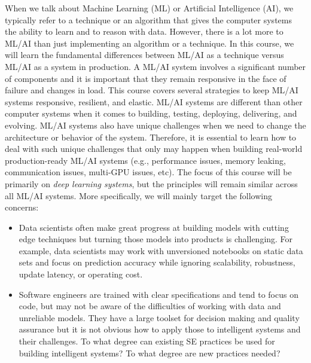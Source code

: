 \documentclass[11pt]{article}
\begin{document}
When we talk about Machine Learning (ML) or Artificial Intelligence (AI), we typically refer to a technique or an algorithm that gives the computer systems the ability to learn and to reason with data. However, there is a lot more to ML/AI than just implementing an algorithm or a technique. In this course, we will learn the fundamental differences between ML/AI as a technique versus ML/AI as a system in production. A ML/AI system involves a significant number of components and it is important that they remain responsive in the face of failure and changes in load. This course covers several strategies to keep ML/AI systems responsive, resilient, and elastic. ML/AI systems are different than other computer systems when it comes to building, testing, deploying, delivering, and evolving. ML/AI systems also have unique challenges when we need to change the architecture or behavior of the system. Therefore, it is essential to learn how to deal with such unique challenges that only may happen when building real-world production-ready ML/AI systems (e.g., performance issues, memory leaking, communication issues, multi-GPU issues, etc). The focus of this course will be primarily on \emph{deep learning systems}, but the principles will remain similar across all ML/AI systems. More specifically, we will mainly target the following concerns:

\begin{itemize}

\item Data scientists often make great progress at building models with cutting edge techniques but turning those models into products is challenging. For example, data scientists may work with unversioned notebooks on static data sets and focus on prediction accuracy while ignoring scalability, robustness, update latency, or operating cost.

\item Software engineers are trained with clear specifications and tend to focus on code, but may not be aware of the difficulties of working with data and unreliable models. They have a large toolset for decision making and quality assurance but it is not obvious how to apply those to intelligent systems and their challenges. To what degree can existing SE practices be used for building intelligent systems? To what degree are new practices needed?
\end{itemize}
\end{document}
